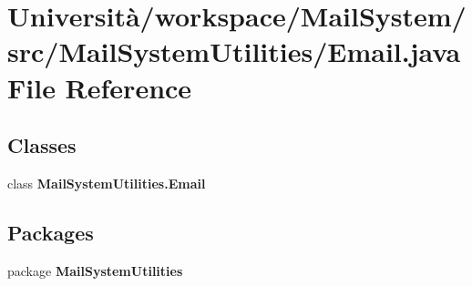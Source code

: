\section{Università/workspace/\+Mail\+System/src/\+Mail\+System\+Utilities/\+Email.java File Reference}
\label{_email_8java}
\subsection*{Classes}
\begin{DoxyCompactItemize}
\item 
class \textbf{ Mail\+System\+Utilities.\+Email}
\end{DoxyCompactItemize}
\subsection*{Packages}
\begin{DoxyCompactItemize}
\item 
package \textbf{ Mail\+System\+Utilities}
\end{DoxyCompactItemize}
